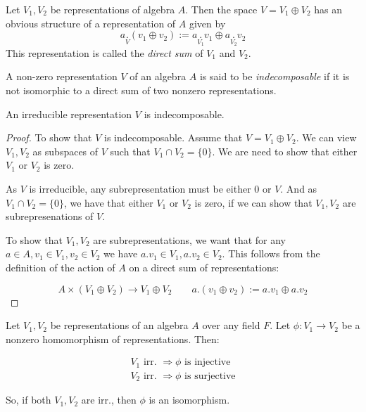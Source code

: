 \begin{defn}
Let \(V_{1},V_{2}\) be representations of algebra \(A\). Then the space \(V=V_{1}\oplus V_{2}\) has an obvious structure of a representation of \(A\) given by
$$a\underset{V}{.}(v_{1}\oplus v_{2}):=a\underset{V_{1}}{.}v_{1}\oplus a\underset{V_{2}}{.}v_{2}$$
This representation is called the \emph{direct sum} of \(V_{1}\) and \(V_{2}\).
\end{defn}

\begin{defn}
A non-zero representation \(V\) of an algebra \(A\) is said to be \emph{indecomposable} if it is not isomorphic to a direct sum of two nonzero representations.
\end{defn}

\begin{prop}
An irreducible representation \(V\) is indecomposable.
\end{prop}

\begin{proof}
To show that \(V\) is indecomposable. Assume that $V=V_{1}\oplus V_{2}$. We can view \(V_{1},V_{2}\) as subspaces of \(V\) such that $V_{1}\cap V_{2}=\{0\}$. We are need to show that either \(V_{1}\) or \(V_{2}\) is zero.

As $V$ is irreducible, any subrepresentation must be either $0$ or \(V\). And as $V_{1}\cap V_{2}=\{0\}$, we have that either \(V_{1}\) or \(V_{2}\) is zero, if we can show that $V_{1},V_{2}$ are subrepresenations of $V$.

To show that $V_{1},V_{2}$ are subrepresentations, we want that for any \(a\in A,v_{1}\in V_{1},v_{2}\in V_{2}\) we have \(a.v_{1}\in V_{1},a.v_{2}\in V_{2}\). This follows from the definition of the action of \(A\) on a direct sum of representations:

\[A\times(V_{1}\oplus V_{2}) \rightarrow  V_{1}\oplus V_{2} \qquad  a.(v_{1}\oplus v_{2}):=a.v_{1}\oplus a.v_{2}\]
\end{proof}

\begin{thm}
 Let \(V_{1},V_{2}\) be representations of an algebra \(A\) over any field \(F\). Let \(\phi :V_{1}\rightarrow V_{2}\) be a nonzero homomorphism of representations. Then:   

\begin{gather*}V_{1} \text{ irr. } \Longrightarrow  \phi  \text{ is injective} \\
 V_{2} \text{ irr. } \Longrightarrow  \phi  \text{ is surjective}\end{gather*}

So, if both \(V_{1},V_{2}\) are irr., then \(\phi \) is an isomorphism.
\end{thm}


